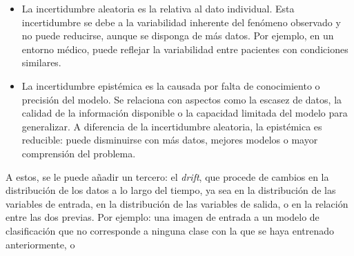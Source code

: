 \begin{itemize}
    
    \item La incertidumbre aleatoria es la relativa al dato individual. 
    Esta incertidumbre se debe a la variabilidad inherente del fenómeno observado y no puede reducirse, aunque 
    se disponga de más datos. Por ejemplo, en un entorno médico, puede reflejar la variabilidad entre 
    pacientes con condiciones similares.

    \item La incertidumbre epistémica es la causada por falta de conocimiento o precisión del modelo.
    Se relaciona con aspectos como la escasez de datos, la calidad de la información disponible o la capacidad 
    limitada del modelo para generalizar. A diferencia de la incertidumbre aleatoria, la epistémica es 
    reducible: puede disminuirse con más datos, mejores modelos o mayor comprensión del problema.
    
\end{itemize}

A estos, se le puede añadir un tercero: el \textit{drift}, que procede de cambios en la distribución de los 
datos a lo largo del tiempo, ya sea en la distribución de las variables de entrada, en la distribución de las
variables de salida, o en la relación entre las dos previas. Por ejemplo: una imagen de entrada a un modelo de
clasificación que no corresponde a ninguna clase con la que se haya entrenado anteriormente, o  









